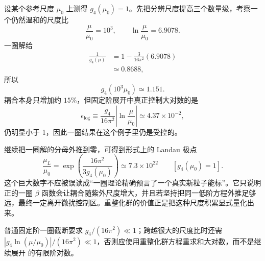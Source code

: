 \begin{exbox}[一圈运行的数值尺度]
设某个参考尺度 $\mu_0$ 上测得 $g_4(\mu_0)=1$。先把分辨尺度提高三个数量级，考察一个仍然温和的尺度比
\begin{equation*}
 \frac\mu{\mu_0}=10^3,
 \qquad
 \ln\frac\mu{\mu_0}=6.9078.
\end{equation*}
一圈解给
\begin{align*}
 \frac1{g_4(\mu)}
 &=1-\frac{3}{16\pi^2}(6.9078)\\
 &\simeq0.8688,
\end{align*}
所以
\begin{equation*}
 g_4(10^3\mu_0)\simeq1.151.
\end{equation*}
耦合本身只增加约 $15\%$，但固定阶展开中真正控制大对数的是
\begin{equation*}
 \epsilon_{\log}
 \equiv\frac{g_4}{16\pi^2}\left|\ln\frac\mu{\mu_0}\right|
 \simeq4.37\times10^{-2},
\end{equation*}
仍明显小于 1，因此一圈结果在这个例子里仍是受控的。

继续把一圈解的分母外推到零，可得到形式上的 Landau 极点
\begin{equation*}
 \frac{\mu_L}{\mu_0}
 =\exp\!\left(\frac{16\pi^2}{3g_4(\mu_0)}\right)
 \simeq7.3\times10^{22}
 \qquad[g_4(\mu_0)=1].
\end{equation*}
这个巨大数字不应被误读成“一圈理论精确预言了一个真实新粒子能标”。它只说明正的一圈 $\beta$ 函数会让耦合随紫外尺度增大，并且若坚持把同一低阶方程外推足够远，最终一定离开微扰控制区。重整化群的价值正是把这种尺度积累显式量化出来。
\end{exbox}

普通固定阶一圈截断要求 \(g_4/(16\pi^2)\ll1\)；跨越很大的尺度比时还需 \(|g_4\ln(\mu/\mu_0)|/(16\pi^2)\ll1\)，否则应使用重整化群方程重求和大对数，而不是继续展开 的有限阶对数。

